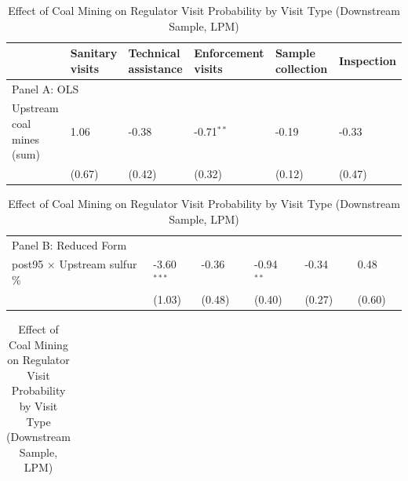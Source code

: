 \begin{table}[htbp]
\raggedright
\begin{minipage}{16cm}
\caption{\label{tab:h2_snsv_d12} Effect of Coal Mining on Regulator Visit Probability by Visit Type (Downstream Sample, LPM)}
\end{minipage}
\small
{\setlength{\tabcolsep}{4pt}%
\begin{tabular}{p{5.5cm}>{\raggedleft\arraybackslash}p{2.1cm}>{\raggedleft\arraybackslash}p{2.1cm}>{\raggedleft\arraybackslash}p{2.1cm}>{\raggedleft\arraybackslash}p{2.1cm}>{\raggedleft\arraybackslash}p{2.1cm}}
\hline\hline
 & Sanitary visits & Technical assistance & Enforcement visits & Sample collection & Inspection \\
\hline
\multicolumn{6}{l}{Panel A: OLS} \\
Upstream coal mines (sum) & \phantom{(}\phantom{-}1.06$^{\phantom{*}\phantom{*}\phantom{*}}$ & \phantom{(}-0.38$^{\phantom{*}\phantom{*}\phantom{*}}$ & \phantom{(}-0.71$^{**\phantom{*}}$ & \phantom{(}-0.19$^{\phantom{*}\phantom{*}\phantom{*}}$ & \phantom{(}-0.33$^{\phantom{*}\phantom{*}\phantom{*}}$ \\
 & (\phantom{-}0.67)\phantom{$^{***}$} & (\phantom{-}0.42)\phantom{$^{***}$} & (\phantom{-}0.32)\phantom{$^{***}$} & (\phantom{-}0.12)\phantom{$^{***}$} & (\phantom{-}0.47)\phantom{$^{***}$} \\
\end{tabular}
\begin{tabular}{p{5.5cm}>{\raggedleft\arraybackslash}p{2.1cm}>{\raggedleft\arraybackslash}p{2.1cm}>{\raggedleft\arraybackslash}p{2.1cm}>{\raggedleft\arraybackslash}p{2.1cm}>{\raggedleft\arraybackslash}p{2.1cm}}
\hline
\multicolumn{6}{l}{Panel B: Reduced Form} \\
post95 $\times$ Upstream sulfur \% & \phantom{(}-3.60$^{***}$ & \phantom{(}-0.36$^{\phantom{*}\phantom{*}\phantom{*}}$ & \phantom{(}-0.94$^{**\phantom{*}}$ & \phantom{(}-0.34$^{\phantom{*}\phantom{*}\phantom{*}}$ & \phantom{(}\phantom{-}0.48$^{\phantom{*}\phantom{*}\phantom{*}}$ \\
 & (\phantom{-}1.03)\phantom{$^{***}$} & (\phantom{-}0.48)\phantom{$^{***}$} & (\phantom{-}0.40)\phantom{$^{***}$} & (\phantom{-}0.27)\phantom{$^{***}$} & (\phantom{-}0.60)\phantom{$^{***}$} \\
\end{tabular}
\begin{tabular}{p{5.5cm}>{\raggedleft\arraybackslash}p{2.1cm}>{\raggedleft\arraybackslash}p{2.1cm}>{\raggedleft\arraybackslash}p{2.1cm}>{\raggedleft\arraybackslash}p{2.1cm}>{\raggedleft\arraybackslash}p{2.1cm}}

\end{tabular}}
\end{table}
